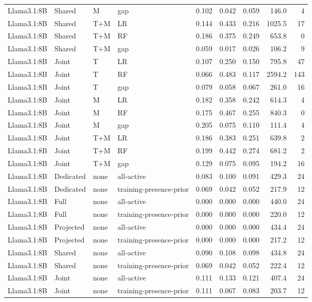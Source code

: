 \begin{longtable}{@{}P{.14\textwidth}P{.13\textwidth}P{.05\textwidth}P{.21\textwidth}rrrrr@{}}
Llama3.1:8B & Shared & M & gap & 0.102 & 0.042 & 0.059 & 146.0 & 4 \\
Llama3.1:8B & Shared & T+M & LR & 0.144 & 0.433 & 0.216 & 1025.5 & 17 \\
Llama3.1:8B & Shared & T+M & RF & 0.186 & 0.375 & 0.249 & 653.8 & 0 \\
Llama3.1:8B & Shared & T+M & gap & 0.059 & 0.017 & 0.026 & 106.2 & 9 \\
Llama3.1:8B & Joint & T & LR & 0.107 & 0.250 & 0.150 & 795.8 & 47 \\
Llama3.1:8B & Joint & T & RF & 0.066 & 0.483 & 0.117 & 2594.2 & 143 \\
Llama3.1:8B & Joint & T & gap & 0.079 & 0.058 & 0.067 & 261.0 & 16 \\
Llama3.1:8B & Joint & M & LR & 0.182 & 0.358 & 0.242 & 614.3 & 4 \\
Llama3.1:8B & Joint & M & RF & 0.175 & 0.467 & 0.255 & 840.3 & 0 \\
Llama3.1:8B & Joint & M & gap & 0.205 & 0.075 & 0.110 & 111.4 & 4 \\
Llama3.1:8B & Joint & T+M & LR & 0.186 & 0.383 & 0.251 & 639.8 & 2 \\
Llama3.1:8B & Joint & T+M & RF & 0.199 & 0.442 & 0.274 & 681.2 & 2 \\
Llama3.1:8B & Joint & T+M & gap & 0.129 & 0.075 & 0.095 & 194.2 & 16 \\
Llama3.1:8B & Dedicated & none & all-active & 0.083 & 0.100 & 0.091 & 429.3 & 24 \\
Llama3.1:8B & Dedicated & none & training-presence-prior & 0.069 & 0.042 & 0.052 & 217.9 & 12 \\
Llama3.1:8B & Full & none & all-active & 0.000 & 0.000 & 0.000 & 440.0 & 24 \\
Llama3.1:8B & Full & none & training-presence-prior & 0.000 & 0.000 & 0.000 & 220.0 & 12 \\
Llama3.1:8B & Projected & none & all-active & 0.000 & 0.000 & 0.000 & 434.4 & 24 \\
Llama3.1:8B & Projected & none & training-presence-prior & 0.000 & 0.000 & 0.000 & 217.2 & 12 \\
Llama3.1:8B & Shared & none & all-active & 0.090 & 0.108 & 0.098 & 434.8 & 24 \\
Llama3.1:8B & Shared & none & training-presence-prior & 0.069 & 0.042 & 0.052 & 222.4 & 12 \\
Llama3.1:8B & Joint & none & all-active & 0.111 & 0.133 & 0.121 & 407.4 & 24 \\
Llama3.1:8B & Joint & none & training-presence-prior & 0.111 & 0.067 & 0.083 & 203.7 & 12 \\

\end{longtable}
